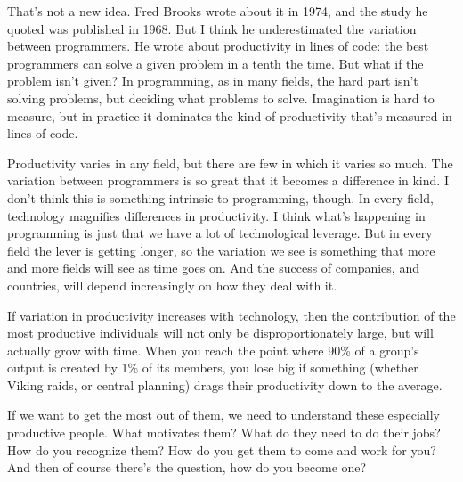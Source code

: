 That's not a new idea.
                    Fred Brooks wrote about it in 1974, and the study he quoted
                    was published in 1968. But I think he underestimated the
                    variation between programmers. He wrote about productivity
                    in lines of code: the best programmers can solve a given
                    problem in a tenth the time. But what if the problem isn't
                    given? In programming, as in many fields, the hard part
                    isn't solving problems, but deciding what problems to solve.
                    Imagination is hard to measure, but in practice it dominates
                    the kind of productivity that's measured in lines of
                    code.

Productivity varies in any field, but there
                    are few in which it varies so much. The variation between
                    programmers is so great that it becomes a difference in
                    kind. I don't think this is something intrinsic to
                    programming, though. In every field, technology magnifies
                    differences in productivity. I think what's happening in
                    programming is just that we have a lot of technological
                    leverage. But in every field the lever is getting longer, so
                    the variation we see is something that more and more fields
                    will see as time goes on. And the success of companies, and
                    countries, will depend increasingly on how they deal with
                    it.

If variation in productivity increases with
                    technology, then the contribution of the most productive
                    individuals will not only be disproportionately large, but
                    will actually grow with time. When you reach the point where
                    90\% of a group's output is created by 1\% of its members, you
                    lose big if something (whether Viking raids, or central
                    planning) drags their productivity down to the average.

If
                    we want to get the most out of them, we need to understand
                    these especially productive people. What motivates them?
                    What do they need to do their jobs? How do you recognize
                    them? How do you get them to come and work for you? And then
                    of course there's the question, how do you become one?

